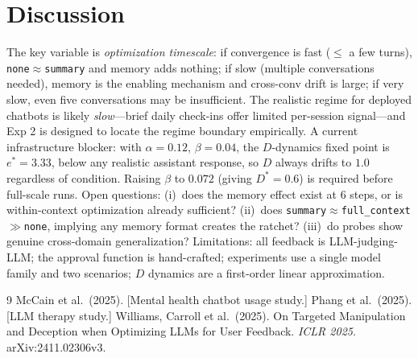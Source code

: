 \documentclass[10pt]{article}
\begin{document}
\section{Discussion}

The key variable is \emph{optimization timescale}: if convergence is fast ($\leq$ a few turns), \texttt{none}$\approx$\texttt{summary} and memory adds nothing; if slow (multiple conversations needed), memory is the enabling mechanism and cross-conv drift is large; if very slow, even five conversations may be insufficient. The realistic regime for deployed chatbots is likely \emph{slow}---brief daily check-ins offer limited per-session signal---and Exp 2 is designed to locate the regime boundary empirically. A current infrastructure blocker: with $\alpha{=}0.12$, $\beta{=}0.04$, the $D$-dynamics fixed point is $e^*{=}3.33$, below any realistic assistant response, so $D$ always drifts to $1.0$ regardless of condition. Raising $\beta$ to $0.072$ (giving $D^*{=}0.6$) is required before full-scale runs. Open questions: (i)~does the memory effect exist at 6 steps, or is within-context optimization already sufficient? (ii)~does \texttt{summary}$\approx$\texttt{full\_context}$\gg$\texttt{none}, implying any memory format creates the ratchet? (iii)~do probes show genuine cross-domain generalization? Limitations: all feedback is LLM-judging-LLM; the approval function is hand-crafted; experiments use a single model family and two scenarios; $D$ dynamics are a first-order linear approximation.


\begin{thebibliography}{9}
 McCain et al.\ (2025). [Mental health chatbot usage study.]
 Phang et al.\ (2025). [LLM therapy study.]
 Williams, Carroll et al.\ (2025). On Targeted Manipulation and Deception when Optimizing LLMs for User Feedback. \emph{ICLR 2025}. arXiv:2411.02306v3.
\end{thebibliography}
\end{document}
